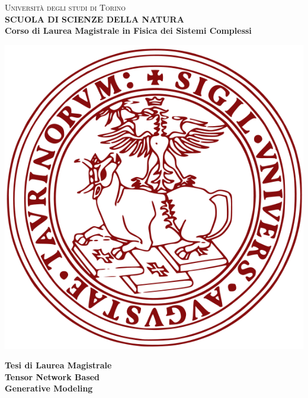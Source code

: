 \begin{titlepage}
\begin{center}
{{\Large{\textsc{Universit\`a degli studi di Torino \\}}}} \vspace{5mm} {\small{\bf SCUOLA DI SCIENZE DELLA NATURA\\ \vspace{3mm}
Corso di Laurea Magistrale in Fisica dei Sistemi Complessi}}
\vspace{5mm}
\end{center}
\begin{center}
\includegraphics[scale=.3]{head/logo.png}
\end{center}
\begin{center}
\vspace{5mm}
{\large{\bf Tesi di Laurea Magistrale\\}}
\vspace{5mm}
{\LARGE{\bf Tensor Network Based\\ Generative Modeling\\}}
\end{center}
\vspace{20mm}
\par

\end{titlepage}
